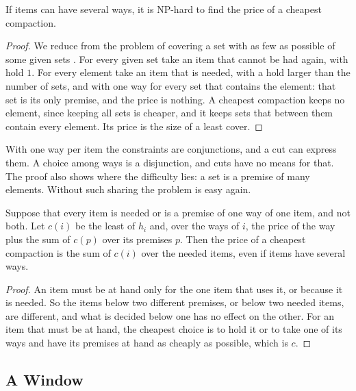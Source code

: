 \documentclass[acmsmall,nonacm,screen]{acmart}
\begin{document}
\begin{theorem}\label{thm:several}
If items can have several ways, it is NP-hard to find the price of a cheapest compaction.
\end{theorem}

\begin{proof}
We reduce from the problem of covering a set with as few as possible of some given sets
\citep{Karp1972}. For every given set take an item that cannot be had again, with hold $1$.
For every element take an item that is needed, with a hold larger than the number of sets,
and with one way for every set that contains the element: that set is its only premise, and
the price is nothing. A cheapest compaction keeps no element, since keeping all sets is
cheaper, and it keeps sets that between them contain every element. Its price is the size of
a least cover.
\end{proof}

With one way per item the constraints are conjunctions, and a cut can express them. A choice
among ways is a disjunction, and cuts have no means for that. The proof also shows where the
difficulty lies: a set is a premise of many elements. Without such sharing the problem is
easy again.

\begin{proposition}\label{prop:unshared}
Suppose that every item is needed or is a premise of one way of one item, and not both. Let
$c(i)$ be the least of $h_i$ and, over the ways of $i$, the price of the way plus the sum of
$c(p)$ over its premises $p$. Then the price of a cheapest compaction is the sum of $c(i)$
over the needed items, even if items have several ways.
\end{proposition}

\begin{proof}
An item must be at hand only for the one item that uses it, or because it is needed. So the
items below two different premises, or below two needed items, are different, and what is
decided below one has no effect on the other. For an item that must be at hand, the cheapest
choice is to hold it or to take one of its ways and have its premises at hand as cheaply as
possible, which is $c$.
\end{proof}

\subsection{A Window}
\end{document}
